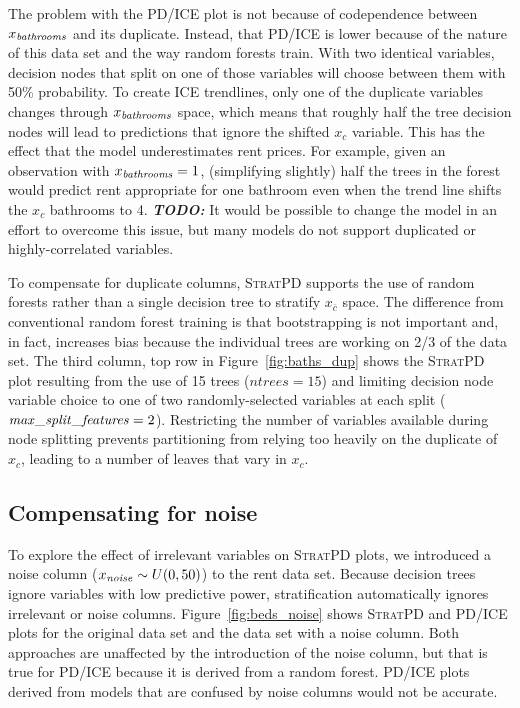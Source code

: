 \documentclass[12pt]{article}
\newcommand{\figref}[1]{Figure~\ref{#1}}
\newcommand{\cut}[1]{}
\newcommand{\todo}[1]{{\bf\em TODO:} {{\color{red}{#1}}}}
\newcommand{\spd}{\fontfamily{cmr}\textsc{\small StratPD}}
\newcommand{\xnc}{$x_{\overline{c}}$}
\begin{document}
The problem with the PD/ICE plot is not because of codependence between $x_{\it bathrooms}$ and its duplicate. Instead, that PD/ICE is lower because of the nature of this data set and the way random forests train. With two identical variables, decision nodes that split on one of those variables will choose between them with 50\% probability.  To create ICE trendlines, only one of the duplicate variables changes through $x_{\it bathrooms}$ space, which means that roughly half the tree decision nodes will lead to predictions that ignore the shifted $x_c$ variable.  This has the effect that the model underestimates rent prices.  For example, given an observation with $x_{\it bathrooms}=1$, (simplifying slightly) half the trees in the forest would predict rent appropriate for one bathroom even when the trend line shifts the $x_c$ bathrooms to 4. \todo{James: is this clear enough?}  It would be possible to change the model in an effort to overcome this issue, but many models do not support duplicated or highly-correlated variables.

\cut{
the reason that the ice plot is lowered is due to the data, which has very few data points in the high range of bedrooms. The average is maybe 1.2, so for roughly half the trees, the prediction will be for 1.2 bedrooms no matter what the duplicated bedroom column says.  This problem occurs for strongly predictive features in RF. Linear model couldn't handle duplicate column.}

To compensate for duplicate columns, \spd{} supports the use of random forests rather than a single decision tree to stratify \xnc{} space. The difference from conventional random forest training is that bootstrapping is not important and, in fact, increases bias because the individual trees are working on 2/3 of the data set. The third column, top row in \figref{fig:baths_dup} shows the \spd{} plot resulting from the use of 15 trees ($ntrees=15$) and limiting decision node variable choice to one of two randomly-selected variables at each split (${\it max\_split\_features}=2$).  Restricting the number of variables available during node splitting prevents partitioning from relying too heavily on the duplicate of $x_c$, leading to a number of leaves that vary in $x_c$.

\subsection{Compensating for noise}\label{sec:noise}

To explore the effect of irrelevant variables on \spd{} plots, we introduced a noise column ($x_{\it noise} \sim U(0,50)$) to the rent data set. Because decision trees ignore variables with low predictive power, stratification automatically ignores irrelevant or noise columns.  \figref{fig:beds_noise} shows \spd{} and PD/ICE plots for the original data set and the data set with a noise column. Both approaches are unaffected by the introduction of the noise column, but that is true for PD/ICE because it is derived from a random forest. PD/ICE plots derived from models that are confused by noise columns would not be accurate.
\end{document}
